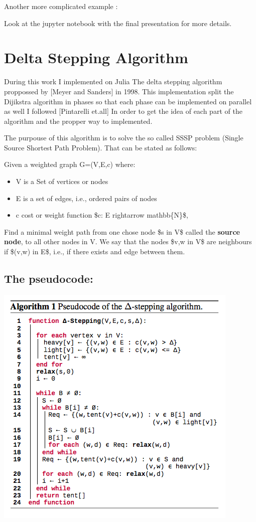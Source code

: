 \documentclass[letterpaper,10pt,english]{sphinxmanual}
\begin{document}
Another more complicated example :

Look at the jupyter notebook with the final presentation for more details.


\chapter{Delta Stepping Algorithm}
\label{Algorithm:delta-stepping-algorithm}\label{Algorithm::doc}\label{Algorithm:algorithm}
During this work I implemented on Julia  The delta stepping algorithm proppossed by {[}Meyer and Sanders{]} in 1998. This implementation split the Dijikstra algorithm  in phases so that each phase can be implemented on parallel as well I followed {[}Pintarelli et.all{]} In order to get the idea of each part of the algorithm and the propper way to implemented.

The purpouse of this algorithm is to solve the so called SSSP problem (Single Source Shortest Path Problem). That can be stated as follows:

Given a weighted graph G=(V,E,c) where:
\begin{itemize}
\item {} 
V is a Set of vertices or nodes

\item {} 
E is a set of edges, i.e., ordered pairs of nodes

\item {} 
c cost or weight function \$c: E rightarrow mathbb\{N\}\$,

\end{itemize}

Find a minimal weight path from one chose node \$s in V\$ called the \textbf{source node}, to all other nodes in V. We say that the nodes \$v,w in V\$ are neighbours if \$(v,w) in E\$, i.e., if there exists and edge between them.


\section{The pseudocode:}
\label{Algorithm:the-pseudocode}
\includegraphics{algo_1.png}
\end{document}

